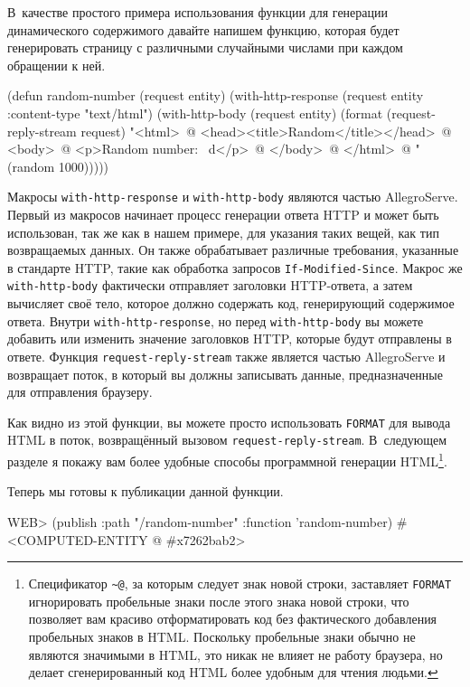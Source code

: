 В~качестве простого примера использования функции для генерации динамического
содержимого давайте напишем функцию, которая будет генерировать страницу с различными
случайными числами при каждом обращении к ней.

\begin{myverb}
(defun random-number (request entity)
  (with-http-response (request entity :content-type "text/html")
    (with-http-body (request entity)
      (format 
       (request-reply-stream request)
       "<html>~@
        <head><title>Random</title></head>~@
        <body>~@
        <p>Random number: ~d</p>~@
        </body>~@
        </html>~@
       "
       (random 1000)))))
\end{myverb}

Макросы \lstinline{with-http-response} и \lstinline{with-http-body} являются частью
AllegroServe. Первый из макросов начинает процесс генерации ответа HTTP и может быть
использован, так же как в нашем примере, для указания таких вещей, как тип возвращаемых
данных. Он также обрабатывает различные требования, указанные в стандарте HTTP, такие как
обработка запросов \lstinline{If-Modified-Since}. Макрос же \lstinline{with-http-body} фактически
отправляет заголовки HTTP-ответа, а затем вычисляет своё тело, которое должно содержать
код, генерирующий содержимое ответа. Внутри \lstinline{with-http-response}, но перед
\lstinline{with-http-body} вы можете добавить или изменить значение заголовков HTTP, которые
будут отправлены в ответе. Функция \lstinline{request-reply-stream} также является частью
AllegroServe и возвращает поток, в который вы должны записывать данные, предназначенные для
отправления браузеру.

Как видно из этой функции, вы можете просто использовать \lstinline{FORMAT} для вывода HTML в
поток, возвращённый вызовом \lstinline{request-reply-stream}. В~следующем разделе я покажу вам
более удобные способы программной генерации HTML\footnote{Спецификатор \lstinline{~@}, за
  которым следует знак новой строки, заставляет \lstinline{FORMAT} игнорировать пробельные
  знаки после этого знака новой строки, что позволяет вам красиво отформатировать код без
  фактического добавления пробельных знаков в HTML. Поскольку пробельные знаки обычно не
  являются значимыми в HTML, это никак не влияет не работу браузера, но делает
  сгенерированный код HTML более удобным для чтения людьми.}.

Теперь мы готовы к публикации данной функции.

\begin{myverb}
WEB> (publish :path "/random-number" :function 'random-number)
#<COMPUTED-ENTITY @ #x7262bab2>
\end{myverb}

